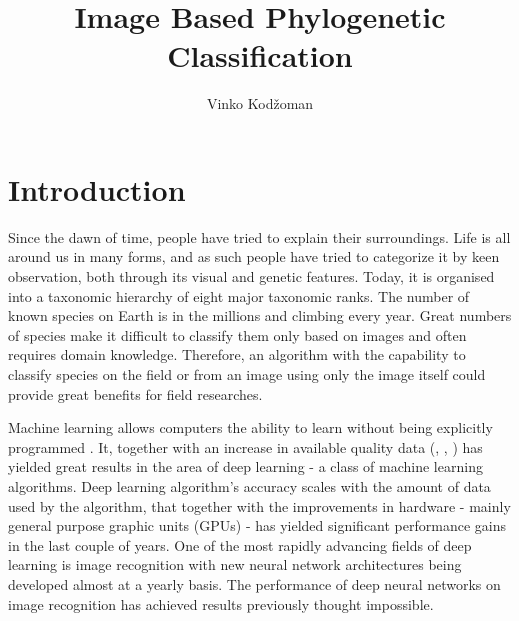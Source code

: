 \documentclass[times, utf8, diplomski]{fer}
\begin{document}
\title{Image Based Phylogenetic Classification}
\author{Vinko Kodžoman}

\maketitle

\izvornik


\tableofcontents

\chapter{Introduction}
\label{se:introduction}
Since the dawn of time, people have tried to explain their surroundings. Life is all around us in many forms, and as such people have tried to categorize it by keen observation, both through its visual and genetic features. Today, it is organised into a taxonomic hierarchy of eight major taxonomic ranks. The number of known species on Earth is in the millions and climbing every year. Great numbers of species make it difficult to classify them only based on images and often requires domain knowledge. Therefore, an algorithm with the capability to classify species on the field or from an image using only the image itself could provide great benefits for field researches.

Machine learning allows computers the ability to learn without being explicitly programmed \citep{samuel_studies_1959}. It, together with an increase in available quality data (\cite{cifar}, \cite{imagenet}, \cite{kaggle}) has yielded great results in the area of deep learning - a class of machine learning algorithms. Deep learning algorithm's accuracy scales with the amount of data used by the algorithm, that together with the improvements in hardware - mainly general purpose graphic units (GPUs) - has yielded significant performance gains in the last couple of years. One of the most rapidly advancing fields of deep learning is image recognition \citep{krizhevsky_imagenet_2012, simonyan_very_2014, szegedy_going_2015, he_deep_2016} with new neural network architectures being developed almost at a yearly basis. The performance of deep neural networks on image recognition has achieved results previously thought impossible.
\end{document}
